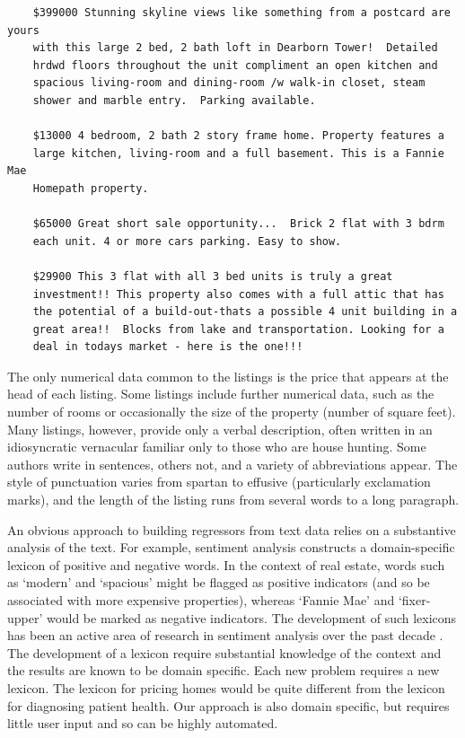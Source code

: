 \documentclass[12pt]{article}
\begin{document}
 \begin{verbatim}
    $399000 Stunning skyline views like something from a postcard are yours
    with this large 2 bed, 2 bath loft in Dearborn Tower!  Detailed
    hrdwd floors throughout the unit compliment an open kitchen and
    spacious living-room and dining-room /w walk-in closet, steam
    shower and marble entry.  Parking available. 

    $13000 4 bedroom, 2 bath 2 story frame home. Property features a
    large kitchen, living-room and a full basement. This is a Fannie Mae
    Homepath property. 

    $65000 Great short sale opportunity...  Brick 2 flat with 3 bdrm
    each unit. 4 or more cars parking. Easy to show. 

    $29900 This 3 flat with all 3 bed units is truly a great
    investment!! This property also comes with a full attic that has
    the potential of a build-out-thats a possible 4 unit building in a 
    great area!!  Blocks from lake and transportation. Looking for a
    deal in todays market - here is the one!!! 
 \end{verbatim}

 \noindent
 The only numerical data common to the listings is the price that appears at
 the head of each listing.  Some listings include further numerical data, such
 as the number of rooms or occasionally the size of the property (number of
 square feet).  Many listings, however, provide only a verbal description,
 often written in an idiosyncratic vernacular familiar only to those who are
 house hunting. Some authors write in sentences, others not, and a variety of
 abbreviations appear.  The style of punctuation varies from spartan to effusive
 (particularly exclamation marks), and the length of the listing runs from
 several words to a long paragraph.

 
 An obvious approach to building regressors from text data relies on a
 substantive analysis of the text.  For example, sentiment analysis constructs a
 domain-specific lexicon of positive and negative words.  In the context of real
 estate, words such as `modern' and `spacious' might be flagged as positive
 indicators (and so be associated with more expensive properties), whereas
 `Fannie Mae' and `fixer-upper' would be marked as negative indicators.  The
 development of such lexicons has been an active area of research in sentiment
 analysis over the past decade \citep{taboada11}.  The development of a lexicon
 require substantial knowledge of the context and the results are known to be
 domain specific.  Each new problem requires a new lexicon.  The lexicon for
 pricing homes would be quite different from the lexicon for diagnosing patient
 health.  Our approach is also domain specific, but requires little user input
 and so can be highly automated.
\end{document}
